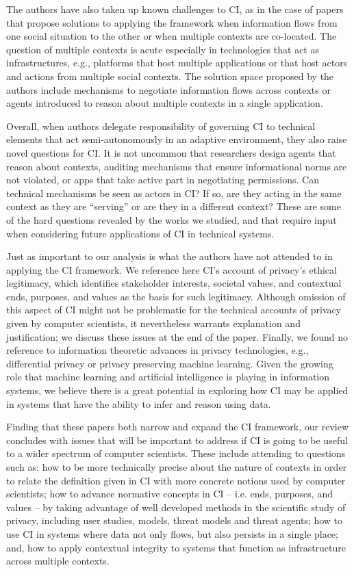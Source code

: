 \documentclass[../thesis.tex]{subfiles}
\begin{document}
The authors have also taken up known challenges to CI, as in the case of
papers that propose solutions to applying the framework when
information flows from one social situation to the other or when
multiple contexts are co-located. The question of multiple contexts is
acute especially in technologies that act as infrastructures, e.g.,
platforms that host multiple applications or that host actors and
actions from multiple social contexts. The solution space proposed by
the authors include mechanisms to negotiate information flows across
contexts or agents introduced to reason about multiple contexts in a
single application.

Overall, when authors delegate responsibility of governing CI to
technical elements that act semi-autonomously in an adaptive
environment, they also raise novel questions for CI.
It is not uncommon
that researchers design agents that reason about contexts, auditing
mechanisms that ensure informational norms are not violated, or apps
that take active part in negotiating permissions. Can technical
mechanisms be seen as actors in CI? If so, are they acting in the same
context as they are ``serving'' or
are they in a different context? These are some of the hard questions
revealed by the works we studied, and that require input when
considering future applications of CI in technical systems.

Just as important to our analysis is what the authors have
not attended
to in applying the CI framework. We reference here CI's
account of privacy's ethical legitimacy, which
identifies stakeholder interests, societal values,
and contextual ends,
purposes, and values as the basis for such legitimacy. Although
omission of this aspect of CI might not be problematic for the
technical accounts of privacy given by computer scientists, it
nevertheless warrants explanation and justification; we discuss these
issues at the end of the paper. Finally, we found no reference to
information theoretic advances in privacy technologies, e.g.,
differential privacy or privacy preserving machine learning. Given the
growing role that machine learning and artificial intelligence is
playing in information systems, we believe there is a great potential
in exploring how CI may be applied in systems that have the ability to
infer and reason using data.

Finding that these papers both narrow and expand the CI framework, our
review concludes with issues that will be important to address if CI is
going to be useful to a wider spectrum of computer scientists. These
include attending to questions such as: how to be more technically
precise about the nature of contexts in order to relate the definition
given in CI with more concrete notions used by computer scientists; how
to advance normative concepts in CI -- i.e. ends, purposes, and
values -- by taking advantage of well developed methods in the
scientific study of privacy, including user studies, models, threat
models and threat agents; how to use CI in systems where data not only
flows, but also persists in a single place; and, how to apply
contextual integrity to systems that function as infrastructure across
multiple contexts. 
\end{document}
